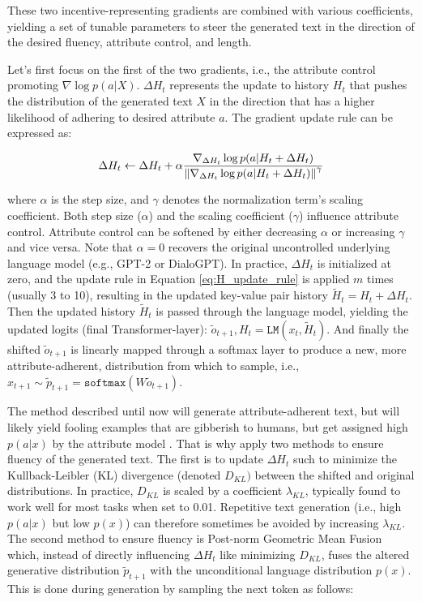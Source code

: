 These two incentive-representing gradients are combined with various coefficients, yielding a set of tunable parameters to steer the generated text in the direction of the desired fluency, attribute control, and length.

Let's first focus on the first of the two gradients, i.e., the attribute control promoting $\nabla \log p(a | X)$. $\Delta H_t$ represents the update to history $H_t$ that pushes the distribution of the generated text $X$ in the direction that has a higher likelihood of adhering to desired attribute $a$. The gradient update rule can be expressed as:

\begin{equation}
    \Delta H_t \leftarrow \Delta H_t + \alpha
    \frac{\nabla_{\Delta H_t} \log p(a | H_t + \Delta H_t)}
    {\norm{\nabla_{\Delta H_t} \log p(a | H_t + \Delta H_t)}^{\gamma}}
\label{eq:H_update_rule}
\end{equation}

where $\alpha$ is the step size, and $\gamma$ denotes the normalization term's scaling coefficient. Both step size ($\alpha$) and the scaling coefficient ($\gamma$) influence attribute control. Attribute control can be softened by either decreasing $\alpha$ or increasing $\gamma$ and vice versa. Note that $\alpha = 0$ recovers the original uncontrolled underlying language model (e.g., GPT-2 or DialoGPT). In practice, $\Delta H_t$ is initialized at zero, and the update rule in Equation \ref{eq:H_update_rule} is applied $m$ times (usually 3 to 10), resulting in the updated key-value pair history $\tilde{H}_t  = H_t + \Delta H_t$. Then the updated history $\tilde{H}_t$ is passed through the language model, yielding the updated logits (final Transformer-layer): $\tilde{o}_{t + 1}, H_t = \texttt{LM}(x_t, \tilde{H}_t)$. And finally the shifted $\tilde{o}_{t + 1}$ is linearly mapped through a softmax layer to produce a new, more attribute-adherent, distribution from which to sample, i.e., $x_{t + 1} \sim \tilde{p}_{t + 1} = \texttt{softmax} \left( W \tilde{o}_{t + 1} \right)$.

The method described until now will generate attribute-adherent text, but will likely yield fooling examples \citep{nguyen2015deep} that are gibberish to humans, but get assigned high $p(a | x)$ by the attribute model \citep{dathathri2019plug}. That is why \cite{dathathri2019plug} apply two methods to ensure fluency of the generated text. The first is to update $\Delta H_t$ such to minimize the Kullback-Leibler (KL) divergence \citep{kullback1951information} (denoted $D_{KL})$ between the shifted and original distributions. In practice, $D_{KL}$ is scaled by a coefficient $\lambda_{KL}$, typically found to work well for most tasks when set to 0.01. Repetitive text generation (i.e., high $p(a | x)$ but low $p(x)$) can therefore sometimes be avoided by increasing $\lambda_{KL}$. The second method to ensure fluency is Post-norm Geometric Mean Fusion \citep{stahlberg-etal-2018-simple} which, instead of directly influencing $\Delta H_t$ like minimizing $D_{KL}$, fuses the altered generative distribution $\tilde{p}_{t + 1}$ with the unconditional language distribution $p(x)$. This is done during generation by sampling the next token as follows:

